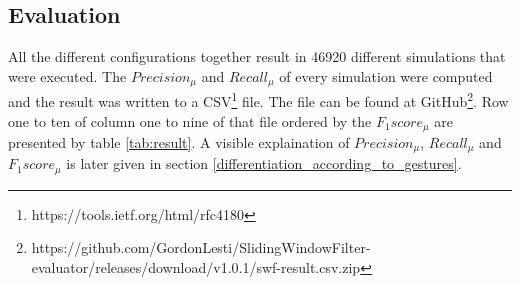 \subsection{Evaluation} \label{evaluation}
All the different configurations together result in 46920 different simulations that were executed. The
$Precision_{\mu}$ and $Recall_{\mu}$ of every simulation were computed and the result was written to a
CSV\footnote{https://tools.ietf.org/html/rfc4180} file. The file can be found at
GitHub\footnote{https://github.com/GordonLesti/SlidingWindowFilter-evaluator/releases/download/v1.0.1/swf-result.csv.zip}.
Row one to ten of column one to nine of that file ordered by the $F_{1}score_{\mu}$ are presented by table
\ref{tab:result}. A visible explaination of $Precision_{\mu}$, $Recall_{\mu}$ and $F_{1}score_{\mu}$ is later given in
section \ref{differentiation_according_to_gestures}.

